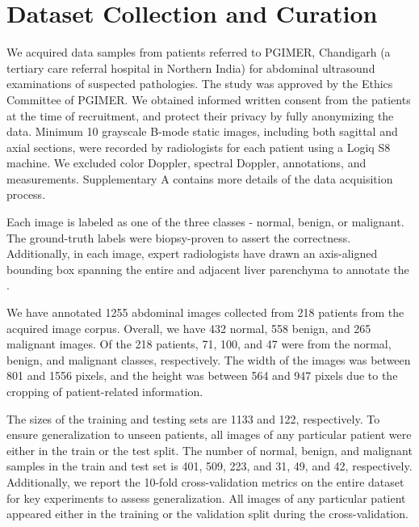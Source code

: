 \section{Dataset Collection and Curation}

%
We acquired data samples from patients referred to PGIMER, Chandigarh (a tertiary care referral hospital in Northern India) for abdominal ultrasound examinations of suspected \gb pathologies. The study was approved by the Ethics Committee of PGIMER. We obtained informed written consent from the patients at the time of recruitment, and protect their privacy by fully anonymizing the data. Minimum 10 grayscale B-mode static images, including both sagittal and axial sections, were recorded by radiologists for each patient using a Logiq S8 machine. We excluded color Doppler, spectral Doppler, annotations, and measurements. Supplementary A %
contains more details of the data acquisition process.

%
Each image is labeled as one of the three classes - normal, benign, or malignant. The ground-truth labels were biopsy-proven to assert the correctness. Additionally, in each image, expert radiologists have drawn an axis-aligned bounding box spanning the entire \gb and adjacent liver parenchyma to annotate the \roi. 

%
We have annotated 1255 abdominal \usg images collected from 218 patients from the acquired image corpus. Overall, we have 432 normal, 558 benign, and 265 malignant images. Of the 218 patients, 71, 100, and 47 were from the normal, benign, and malignant classes, respectively. The width of the images was between 801 and 1556 pixels, and the height was between 564 and 947 pixels due to the cropping of patient-related information. 

%
The sizes of the training and testing sets are 1133 and 122, respectively. To ensure generalization to unseen patients, all images of any particular patient were either in the train or the test split. The number of normal, benign, and malignant samples in the train and test set is 401, 509, 223, and 31, 49, and 42, respectively. Additionally, we report the 10-fold cross-validation metrics on the entire dataset for key experiments to assess generalization. All images of any particular patient appeared either in the training or the validation split during the cross-validation. 